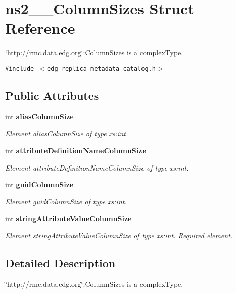 \section{ns2\_\-\_\-Column\-Sizes Struct Reference}
\label{structns2____ColumnSizes}
\char`\"{}http://rmc.data.edg.org\char`\"{}:Column\-Sizes is a complex\-Type.  


{\tt \#include $<$edg-replica-metadata-catalog.h$>$}

\subsection*{Public Attributes}
\begin{CompactItemize}
\item 
int \bf{alias\-Column\-Size}
\begin{CompactList}\small\item\em Element alias\-Column\-Size of type xs:int. \item\end{CompactList}\item 
int \bf{attribute\-Definition\-Name\-Column\-Size}
\begin{CompactList}\small\item\em Element attribute\-Definition\-Name\-Column\-Size of type xs:int. \item\end{CompactList}\item 
int \bf{guid\-Column\-Size}
\begin{CompactList}\small\item\em Element guid\-Column\-Size of type xs:int. \item\end{CompactList}\item 
int \bf{string\-Attribute\-Value\-Column\-Size}\label{structns2____ColumnSizes_5fd5ae4919a9fc3b05e91323572e32c8}

\begin{CompactList}\small\item\em Element string\-Attribute\-Value\-Column\-Size of type xs:int. Required element. \item\end{CompactList}\end{CompactItemize}


\subsection{Detailed Description}
\char`\"{}http://rmc.data.edg.org\char`\"{}:Column\-Sizes is a complex\-Type. 



